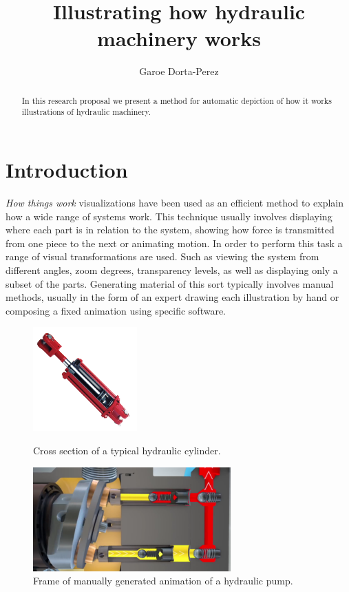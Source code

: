 \documentclass[11pt]{report}
\title{ Illustrating how hydraulic machinery works } \author{Garoe Dorta-Perez}
\begin{document}
\maketitle
\begin{abstract}
In this research proposal we present a method for automatic depiction of how it works illustrations of hydraulic machinery. \end{abstract}


\chapter{Introduction}
\label{ch:intro}

\textit{How things work} visualizations have been used as an efficient method to explain how a wide range of systems work.
This technique usually involves displaying where each part is in relation to the system, showing how force is transmitted from one piece to the next or animating motion. 
In order to perform this task a range of visual transformations are used.
Such as viewing the system from different angles, zoom degrees,  transparency levels, as well as displaying only a subset of the parts.
Generating material of this sort typically involves manual methods, usually in the form of an expert drawing each illustration by hand or composing a fixed animation using specific software.\\

\begin{figure}
	\centering
	\begin{minipage}[t]{.45\textwidth}
		\centering
		\includegraphics[width=.8\textwidth,height=4cm]{images/h_pump}
		\caption{Cross section of a typical hydraulic cylinder.}
		\label{fig:h_pump}
	\end{minipage}\hfill
	\begin{minipage}[t]{.45\textwidth}
		\centering
		\includegraphics[width=.8\textwidth,height=4cm]{images/cylinder_animation}
		\caption{Frame of manually generated animation of a hydraulic pump.}
		\label{fig:cylinder_animation}
	\end{minipage}
\end{figure}
\end{document}
